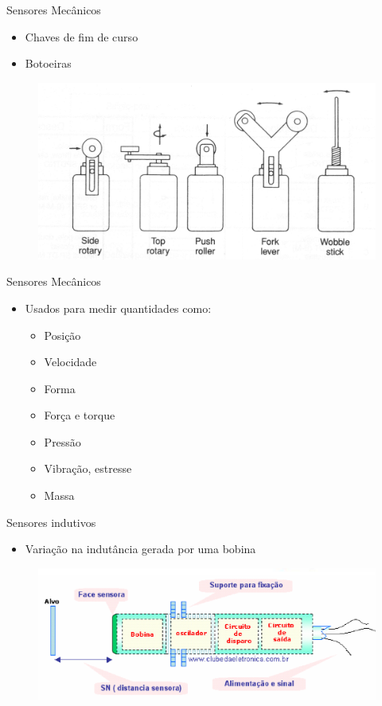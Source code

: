 \documentclass[aspectratio=169,
				xcolor=table]{beamer}
\begin{document}
		\begin{frame}{Sensores Mecânicos}
			\begin{itemize}
				\item Chaves de fim de curso
				\item Botoeiras
			\end{itemize}
			\begin{figure}
				\centering
				\includegraphics[scale=.4]{../figs/cap03/Imagem15}	
			\end{figure}
		\end{frame}	
		
		\begin{frame}{Sensores Mecânicos}
			\begin{itemize}
				\item Usados para medir quantidades como:
				\begin{itemize}
					\item Posição
					\item Velocidade
					\item Forma
					\item Força e torque
					\item Pressão
					\item Vibração, estresse
					\item Massa			
				\end{itemize}
			\end{itemize}
		\end{frame}
		
		\begin{frame}{Sensores indutivos}
			\begin{itemize}
				\item Variação na indutância gerada por uma bobina
			\end{itemize}
			\begin{figure}
				\centering
				\includegraphics[scale=.4]{../figs/cap03/Imagem16}	
			\end{figure}		
		\end{frame}
		
\end{document}
